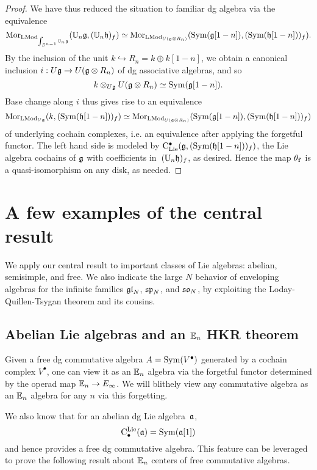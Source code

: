 \documentclass[11pt]{amsart}
\numberwithin{equation}{section}
\begin{document}
\begin{proof}
We have thus reduced the situation to familiar dg algebra via the equivalence
\[
{\rm Mor}_{{\rm LMod}_{\int_{S^{n-1}} \mathbb U_n\mathfrak g}}(\mathbb U_n \mathfrak g, (\mathbb U_n \mathfrak h)_f) 
\simeq 
{\rm Mor}_{{\rm LMod}_{U(\mathfrak g \otimes R_n)}} ({\rm Sym}(\mathfrak g[1-n]), ({\rm Sym}(\mathfrak h[1-n]))_f).
\]
By the inclusion of the unit $k \hookrightarrow R_n = k \oplus k[1-n]$,
we obtain a canonical inclusion $i: U\mathfrak g \to U(\mathfrak g \otimes R_n)$ of dg associative algebras,
and so
\[
k \otimes_{U\mathfrak g} U(\mathfrak g \otimes R_n) \simeq {\rm Sym}(\mathfrak g[1-n]).
\]
Base change along $i$ thus gives rise to an equivalence 
\[
{\rm Mor}_{{\rm LMod}_{U\mathfrak g}} (k, ({\rm Sym}(\mathfrak h[1-n]))_f) \simeq {\rm Mor}_{{\rm LMod}_{U(\mathfrak g \otimes R_n)}} ({\rm Sym}(\mathfrak g[1-n]), ({\rm Sym}(\mathfrak h[1-n]))_f)
\]
of underlying cochain complexes, i.e. an equivalence after applying the forgetful functor. 
The left hand side is modeled by ${\rm C}_{\rm Lie}^\bullet(\mathfrak g,({\rm Sym}(\mathfrak h[1-n]))_f)$, 
the Lie algebra cochains of $\mathfrak g$ with coefficients in~$(\mathbb U_n \mathfrak h)_f$, as desired.
Hence the map $\theta_{\bf f}$ is a quasi-isomorphism on any disk, as needed.
\end{proof}

\section{A few examples of the central result}

We apply our central result to important classes of Lie algebras: 
abelian, semisimple, and free.
We also indicate the large $N$ behavior of enveloping algebras for the infinite families $\frak{gl}_N$, $\frak{sp}_N$, and $\frak{so}_N$,
by exploiting the Loday-Quillen-Tsygan theorem and its cousins.

\subsection{Abelian Lie algebras and an $\mathbb E_n$ HKR theorem}

Given a free dg commutative algebra $A = {\rm Sym}(V^\bullet)$ generated by a cochain complex $V^\bullet$,
one can view it as an $\mathbb E_n$ algebra via the forgetful functor determined by the operad map $\mathbb E_n \to E_\infty$.
We will blithely view any commutative algebra as an $\mathbb E_n$ algebra for any $n$ via this forgetting.

We also know that for an abelian dg Lie algebra~${\frak a}$, 
\[
{\rm C}^{\rm Lie}_\bullet({\frak a}) = {\rm Sym}({\frak a}[1])
\]
and hence provides a free dg commutative algebra.
This feature can be leveraged to prove the following result about $\mathbb E_n$ centers of free commutative algebras.
\end{document}
